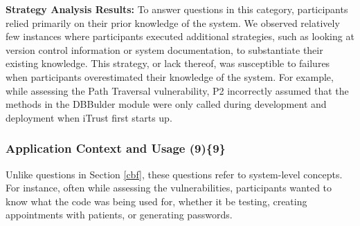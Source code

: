 \documentclass[10pt,journal,compsoc]{IEEEtran}
\begin{document}
\textbf{Strategy Analysis Results:}
To answer questions in this category, participants relied primarily on their prior knowledge of the system.
We observed relatively few instances where participants executed additional strategies, such as looking at version control information or system documentation, to substantiate their existing knowledge. 
This strategy, or lack thereof, was susceptible to failures when participants overestimated their knowledge of the system.
For example, while assessing the Path Traversal vulnerability, P2 incorrectly assumed that the methods in the DBBulder module were only called during development and deployment when iTrust first starts up.




% 


\subsubsection{Application Context and Usage (9)\{9\}}\label{acu}

Unlike questions in Section \ref{cbf}, these questions refer to system-level concepts.
For instance, often while assessing the vulnerabilities, participants wanted to know what the code was being used for, whether it be testing, creating appointments with patients, or generating passwords.
\\
\end{document}
